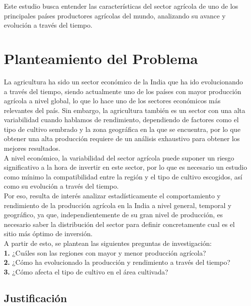 \documentclass[oneside,11pt]{Latex/Classes/PhDthesisPSnPDF}
\begin{document}
Este estudio busca entender las características del sector agrícola de
uno de los principales países productores agrícolas del mundo,
analizando su avance y evolución a través del tiempo.

\chapter{Planteamiento del Problema}

La agricultura ha sido un sector económico de la India que ha ido
evolucionando a través del tiempo, siendo actualmente uno de los países
con mayor producción agrícola a nivel global, lo que lo hace uno de los
sectores económicos más relevantes del país. Sin embargo, la agricultura
también es un sector con una alta variabilidad cuando hablamos de
rendimiento, dependiendo de factores como el tipo de cultivo sembrado y
la zona geográfica en la que se encuentra, por lo que obtener una alta
producción requiere de un análisis exhaustivo para obtener los mejores
resultados.\\

A nivel económico, la variabilidad del sector agrícola puede suponer un
riesgo significativo a la hora de invertir en este sector, por lo que es
necesario un estudio como mínimo la compatibilidad entre la región y el
tipo de cultivo escogidos, así como su evolución a través del tiempo.\\

Por eso, resulta de interés analizar estadísticamente el comportamiento
y rendimiento de la producción agrícola en la India a nivel general,
temporal y geográfico, ya que, independientemente de su gran nivel de
producción, es necesario saber la distribución del sector para definir
concretamente cual es el sitio más óptimo de inversión.\\

A partir de esto, se plantean las siguientes preguntas de
investigación:\\

\textbf{1.} ¿Cuáles son las regiones con mayor y menor producción
agrícola?\\

\textbf{2.} ¿Cómo ha evolucionado la producción y rendimiento a través
del tiempo?\\

\textbf{3.} ¿Cómo afecta el tipo de cultivo en el área cultivada?\\

\section{Justificación}
\end{document}
